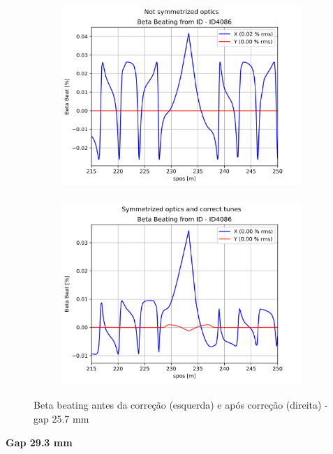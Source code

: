 \documentclass[a4paper,12pt]{article}
\begin{document}
\begin{figure}[H]
\begin{subfigure}{0.5\textwidth}
\includegraphics[width=0.9\linewidth, height=7cm]{figs/phase-16 gap25 uncorrected-optics.png} 
\label{fig:subim1-1625}
\end{subfigure}
\begin{subfigure}{0.5\textwidth}
\includegraphics[width=0.9\linewidth, height=7cm]{figs/phase-16 gap25 corrected-optics-tunes.png}
\label{fig:subim2-1625}
\end{subfigure}
\caption{Beta beating antes da correção (esquerda) e após correção (direita) - gap 25.7 mm}
\label{fig:bb-16_25}
\end{figure}

\textbf{Gap 29.3 mm} \\
\end{document}
